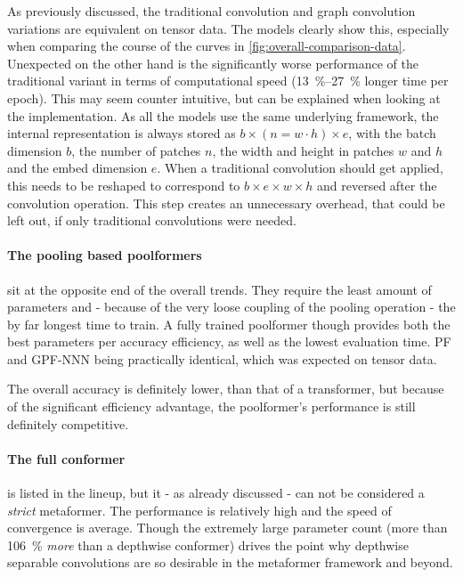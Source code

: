 As previously discussed, the traditional convolution and graph convolution variations are equivalent on tensor data.
The models clearly show this, especially when comparing the course of the curves in \autoref{fig:overall-comparison-data}.
Unexpected on the other hand is the significantly worse performance of the traditional variant in terms of computational speed (\SIrange{13}{27}{\percent} longer time per epoch).
This may seem counter intuitive, but can be explained when looking at the implementation. 
As all the models use the same underlying framework, the internal representation is always stored as $b \times (n=w\cdot h) \times e$, with the batch dimension $b$, the number of patches $n$, the width and height in patches $w$ and $h$ and the embed dimension $e$. 
When a traditional convolution should get applied, this needs to be reshaped to correspond to $b \times e \times w \times h$ and reversed after the convolution operation. 
This step creates an unnecessary overhead, that could be left out, if only traditional convolutions were needed.

\paragraph{The pooling based poolformers} sit at the opposite end of the overall trends.
They require the least amount of parameters and - because of the very loose coupling of the pooling operation - the by far longest time to train.
A fully trained poolformer though provides both the best parameters per accuracy efficiency, as well as the lowest evaluation time.
PF and GPF-NNN being practically identical, which was expected on tensor data.

The overall accuracy is definitely lower, than that of a transformer, but because of the significant efficiency advantage, the poolformer's performance is still definitely competitive.

\paragraph{The full conformer} is listed in the lineup, but it - as already discussed - can not be considered a \emph{strict} metaformer.
The performance is relatively high and the speed of convergence is average. 
Though the extremely large parameter count (more than \SI[]{106}[]{\percent} \emph{more} than a depthwise conformer) drives the point why depthwise separable convolutions are so desirable in the metaformer framework and beyond.
